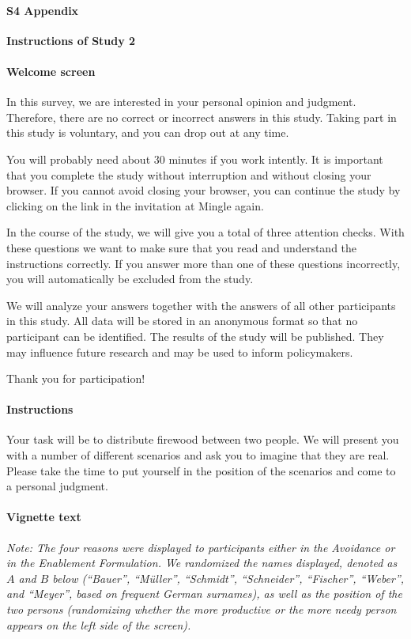 \documentclass[10pt,letterpaper]{article}
\begin{document}
\paragraph*{S4 Appendix}
{\bf Instructions of Study 2}


\paragraph*{Welcome screen}
In this survey, we are interested in your personal opinion and judgment.
Therefore, there are no correct or incorrect answers in this study.
Taking part in this study is voluntary, and you can drop out at any time.

You will probably need about $30$ minutes if you work intently.
It is important that you complete the study without interruption and without closing your browser.
If you cannot avoid closing your browser, you can continue the study by clicking on the link in the invitation at Mingle again.

In the course of the study, we will give you a total of three attention checks.
With these questions we want to make sure that you read and understand the instructions correctly.
If you answer more than one of these questions incorrectly, you will automatically be excluded from the study.

We will analyze your answers together with the answers of all other participants in this study.
All data will be stored in an anonymous format so that no participant can be identified.
The results of the study will be published.
They may influence future research and may be used to inform policymakers.

Thank you for participation!


\paragraph*{Instructions}
Your task will be to distribute firewood between two people.
We will present you with a number of different scenarios and ask you to imagine that they are real.
Please take the time to put yourself in the position of the scenarios and come to a personal judgment.


\paragraph*{Vignette text} \noindent\textit{Note: The four reasons were displayed to participants either in the Avoidance or in the Enablement Formulation.
We randomized the names displayed, denoted as $A$ and $B$ below (``Bauer'', ``Müller'', ``Schmidt'', ``Schneider'', ``Fischer'', ``Weber'', and ``Meyer'', based on frequent German surnames), as well as the position of the two persons (randomizing whether the more productive or the more needy person appears on the left side of the screen).}\vspace{2ex}
\end{document}
